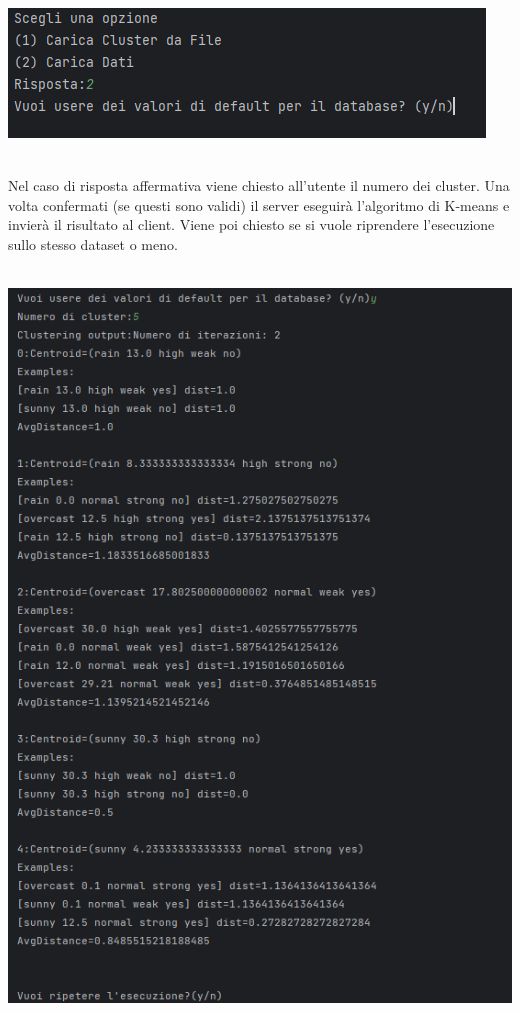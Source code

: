 \begin{enumerate}
\begin{itemize}[label=-]
\begin{itemize}[label=-]
\begin{minipage}[t]{0.3\textwidth}
        \includegraphics[scale=0.8]{img/test9.png}
      \end{minipage}
      \\ Nel caso di risposta affermativa viene chiesto all'utente il numero dei cluster. Una volta confermati (se questi sono validi) il server eseguirà l'algoritmo di K-means e invierà il risultato al client. Viene poi chiesto se si vuole riprendere l'esecuzione sullo stesso dataset o meno. \\ \\
      \begin{minipage}[t]{0.3\textwidth}
        \includegraphics[scale=0.8]{img/test10.png}

\end{minipage}
\end{itemize}
\end{itemize}
\end{enumerate}
